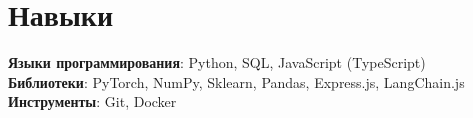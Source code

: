 \section{Навыки}
    \begin{itemize}[leftmargin=0.15in, label={}]
	\small{\item{
		 \textbf{Языки программирования}{: Python, SQL, JavaScript (TypeScript)} \\
		 \textbf{Библиотеки}{: PyTorch, NumPy, Sklearn, Pandas, Express.js, LangChain.js} \\
		 \textbf{Инструменты}{: Git, Docker} \\
	}}
    \end{itemize}
